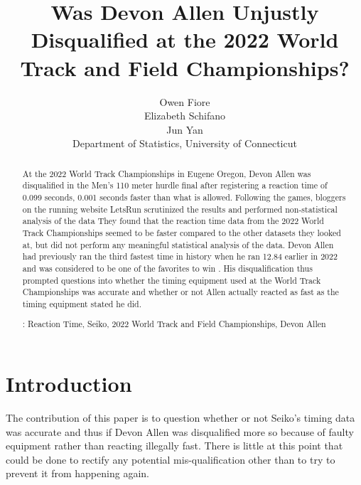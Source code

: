 \documentclass[12pt, letterpaper, titlepage]{article}
\title{Was Devon Allen Unjustly Disqualified at the 2022 World Track and Field Championships?}
\author{Owen Fiore\\
  Elizabeth Schifano\\
  Jun Yan\\[1ex]
  Department of Statistics, University of Connecticut\\
}
\date{}
\begin{document}
\maketitle

\doublespace

\begin{abstract}
  At the 2022 World Track Championships in Eugene Oregon, Devon Allen was disqualified in the
  Men's 110 meter hurdle final after registering a reaction time of 0.099 seconds, 0.001 
  seconds faster than what is allowed.  Following the games, bloggers on the running website 
  LetsRun scrutinized the results and performed non-statistical analysis of the data \citep{Johnson}
  They found that the reaction time data from the 2022 World Track Championships seemed to be faster 
  compared to the other datasets they looked at, but did not perform any meaningful statistical 
  analysis of the data.  Devon Allen had previously ran the third fastest time in history when 
  he ran 12.84 earlier in 2022 and was considered to be one of the favorites to win \citep{Preview}.  His 
  disqualification thus prompted questions into whether the timing equipment used at the World
  Track Championships was accurate and whether or not Allen actually reacted as fast as the 
  timing equipment stated he did.

\bigskip
\noindent{}:
Reaction Time, Seiko, 2022 World Track and Field Championships, Devon Allen

\end{abstract}



\section{Introduction}
\label{sec:intro}


The contribution of this paper is to question whether or not Seiko's timing data
was accurate and thus if Devon Allen was disqualified more so because of faulty
equipment rather than reacting illegally fast.  There is little at this point
that could be done to rectify any potential mis-qualification other than to try
to prevent it from happening again.
\end{document}
